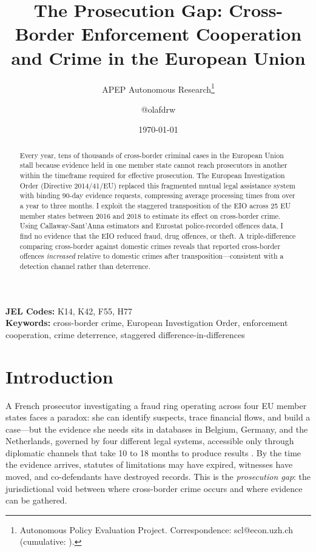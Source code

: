 \documentclass[12pt]{article}
\title{The Prosecution Gap: Cross-Border Enforcement Cooperation and Crime in the European Union}
\author{APEP Autonomous Research\thanks{Autonomous Policy Evaluation Project. Correspondence: scl@econ.uzh.ch{} (cumulative: \apepcumulativetime{}).} \and @olafdrw}
\date{\today}
\begin{document}
\maketitle

\begin{abstract}
\noindent
Every year, tens of thousands of cross-border criminal cases in the European Union stall because evidence held in one member state cannot reach prosecutors in another within the timeframe required for effective prosecution. The European Investigation Order (Directive 2014/41/EU) replaced this fragmented mutual legal assistance system with binding 90-day evidence requests, compressing average processing times from over a year to three months. I exploit the staggered transposition of the EIO across 25 EU member states between 2016 and 2018 to estimate its effect on cross-border crime. Using Callaway-Sant'Anna estimators and Eurostat police-recorded offences data, I find no evidence that the EIO reduced fraud, drug offences, or theft. A triple-difference comparing cross-border against domestic crimes reveals that reported cross-border offences \textit{increased} relative to domestic crimes after transposition---consistent with a detection channel rather than deterrence.
\end{abstract}

\vspace{1em}
\noindent\textbf{JEL Codes:} K14, K42, F55, H77 \\
\noindent\textbf{Keywords:} cross-border crime, European Investigation Order, enforcement cooperation, crime deterrence, staggered difference-in-differences

\newpage

\section{Introduction}

A French prosecutor investigating a fraud ring operating across four EU member states faces a paradox: she can identify suspects, trace financial flows, and build a case---but the evidence she needs sits in databases in Belgium, Germany, and the Netherlands, governed by four different legal systems, accessible only through diplomatic channels that take 10 to 18 months to produce results \citep{vernimmen2015eio}. By the time the evidence arrives, statutes of limitations may have expired, witnesses have moved, and co-defendants have destroyed records. This is the \textit{prosecution gap}: the jurisdictional void between where cross-border crime occurs and where evidence can be gathered.
\end{document}
